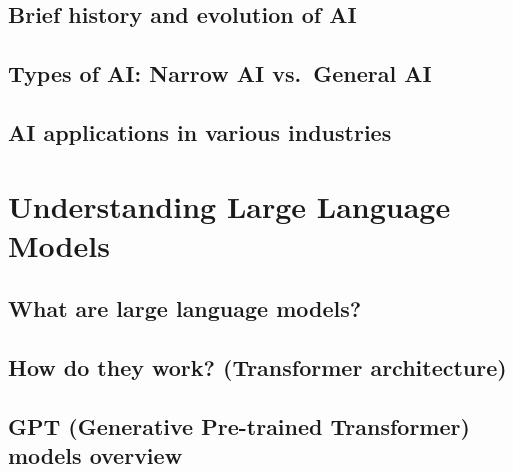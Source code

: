 \documentclass[
]{book}
\begin{document}
\citep{xie2015}

\hypertarget{brief-history-and-evolution-of-ai}{%
\section*{Brief history and evolution of AI}\label{brief-history-and-evolution-of-ai}}

\hypertarget{types-of-ai-narrow-ai-vs.-general-ai}{%
\section*{Types of AI: Narrow AI vs.~General AI}\label{types-of-ai-narrow-ai-vs.-general-ai}}

\hypertarget{ai-applications-in-various-industries}{%
\section*{AI applications in various industries}\label{ai-applications-in-various-industries}}

\hypertarget{understanding-large-language-models}{%
\chapter*{Understanding Large Language Models}\label{understanding-large-language-models}}

\hypertarget{what-are-large-language-models}{%
\section*{What are large language models?}\label{what-are-large-language-models}}

\hypertarget{how-do-they-work-transformer-architecture}{%
\section*{How do they work? (Transformer architecture)}\label{how-do-they-work-transformer-architecture}}

\hypertarget{gpt-generative-pre-trained-transformer-models-overview}{%
\section*{GPT (Generative Pre-trained Transformer) models overview}\label{gpt-generative-pre-trained-transformer-models-overview}}
\end{document}
